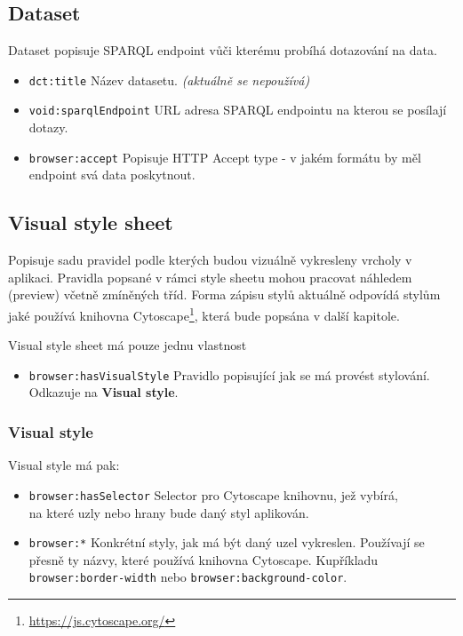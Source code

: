 \subsection{Dataset} \label{pozadavky-dataset}
Dataset popisuje SPARQL endpoint vůči kterému probíhá dotazování na data.

\begin{itemize}
    \item \texttt{dct:title} Název datasetu. \textit{(aktuálně se nepoužívá)}
    \item \texttt{void:sparqlEndpoint} URL adresa SPARQL endpointu na kterou se posílají dotazy.
    \item \texttt{browser:accept} Popisuje HTTP Accept type - v jakém formátu by měl endpoint svá data poskytnout.
\end{itemize}

\subsection{Visual style sheet} \label{pozadavky-visual-style-sheet}
Popisuje sadu pravidel podle kterých budou vizuálně vykresleny vrcholy v aplikaci. Pravidla popsané v rámci style sheetu mohou pracovat náhledem (preview) včetně zmíněných tříd. Forma zápisu stylů aktuálně odpovídá stylům jaké používá knihovna Cytoscape\footnote{\url{https://js.cytoscape.org/}}, která bude popsána v další kapitole.

Visual style sheet má pouze jednu vlastnost

\begin{itemize}
    \item \texttt{browser:hasVisualStyle} Pravidlo popisující jak se má provést stylování. Odkazuje na \textbf{Visual style}.
\end{itemize}

\subsubsection{Visual style}
Visual style má pak:

\begin{itemize}
    \item \texttt{browser:hasSelector} Selector pro Cytoscape knihovnu, jež vybírá, \\ na které uzly nebo hrany bude daný styl aplikován.
    \item \texttt{browser:*} Konkrétní styly, jak má být daný uzel vykreslen. Používají se přesně ty názvy, které používá knihovna Cytoscape. Kupříkladu \\\texttt{browser:border-width} nebo \texttt{browser:background-color}.
\end{itemize}


